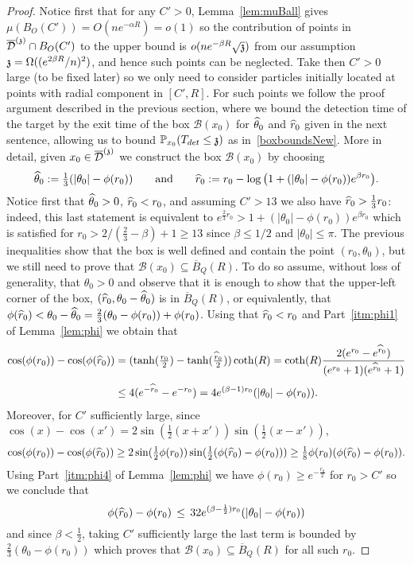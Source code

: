 \begin{proof}
Notice first that for any $C'>0$, Lemma~\ref{lem:muBall} gives $\mu(B_O(C'))=O(ne^{-\alpha R})=o(1)$ so the contribution of points in $\ndt\cap B_O(C')$ to the upper bound is $o(ne^{-\beta R}\sqrt{\ss})$ from our assumption $\ss=\Omega((e^{2\beta R}/n)^{2})$, and hence such points can be neglected. Take then $C'>0$ large (to be fixed later) so we only need to consider particles initially located at points with radial component in $[C',R]$. For such points we follow the proof argument described in the previous section, where we bound the detection time of the target by the exit time of the box
$\mathcal{B}(x_0)$ for $\hatt$ and $\hatr$ given in the next sentence, allowing us to bound $\PP_{x_0}(T_{det}\leq\ss)$ as in~\eqref{boxboundsNew}. More in detail, given $x_0\in\ndt$ we construct the box $\mathcal{B}(x_0)$ by choosing 
\[\hatt:=\tfrac{1}{3}(|\theta_0|-\phi(r_0))\qquad\text{and}\qquad\hatr:=r_0-\log\big(1+(|\theta_0|-\phi(r_0))e^{\beta r_0}\big).\]
Notice first that $\hatt>0$, $\hatr<r_0$, and assuming $C'>13$ we also have $\hatr>\frac13 r_0$: indeed, this last statement is equivalent to 
$e^{\frac23 r_0}>1+(|\theta_0|-\phi(r_0))e^{\beta r_0}$
which is satisfied for $r_0>2/(\frac{2}{3}-\beta)+1\geq 13$ since $\beta\leq1/2$ and $|\theta_0|\leq\pi$. The previous inequalities show that the box is well defined and contain the point $(r_0,\theta_0)$, but we still need to prove that $\mathcal{B}(x_0)\subseteq \overline{B}_Q(R)$. To do so 
assume, without loss of generality, that $\theta_0>0$  and 
observe that it is enough to show that the upper-left corner of the box, $(\hatr,\theta_0-\hatt)$ is in $\overline{B}_Q(R)$, or equivalently, that $\phi(\hatr)<\theta_0-\hatt=\frac{2}{3}(\theta_0-\phi(r_0))+\phi(r_0)$. Using that $\hatr<r_0$ and Part~\eqref{itm:phi1} of Lemma~\ref{lem:phi} we obtain that 
\begin{align*}\cos(\phi(r_0))-\cos(\phi(\hatr))&=(\tanh(\tfrac{r_0}{2})-\tanh(\tfrac{\hatr}{2}))\coth(R)=\coth (R)\frac{2(e^{r_0}-e^{\hatr})}{(e^{r_0}+1)(e^{\hatr}+1)}\\[3pt]&\leq4(e^{-\hatr}-e^{-r_0})=4e^{(\beta-1)r_0}(|\theta_0|-\phi(r_0)). 
\end{align*}
Moreover, for $C'$ sufficiently large, since $\cos(x)-\cos(x')=2\sin(\frac12(x+x'))\sin(\frac12(x-x'))$, 
\[\cos(\phi(r_0))-\cos(\phi(\hatr))\ge 2\sin(\tfrac12\phi(r_0))\sin(\tfrac12(\phi(\hatr)-\phi(r_0)))\geq\tfrac18\phi(r_0)(\phi(\hatr)-\phi(r_0)).\]
Using Part~\eqref{itm:phi4} of Lemma~\ref{lem:phi} we have $\phi(r_0)\geq e^{-\frac{r_0}{2}}$ for $r_0>C'$ so we conclude that 
\[\phi(\hatr)-\phi(r_0)\,\leq\,32e^{(\beta-\frac{1}{2})r_0}(|\theta_0|-\phi(r_0))\]
and since $\beta<\frac{1}{2}$, taking $C'$ sufficiently large the last term is bounded by $\frac{2}{3}(\theta_0-\phi(r_0))$ which proves that  $\mathcal{B}(x_0)\subseteq \overline{B}_Q(R)$ for all such $r_0$. 


\end{proof}
